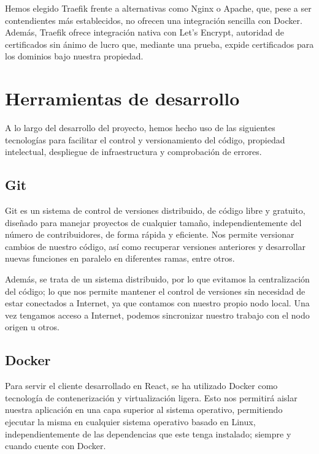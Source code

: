 Hemos elegido Traefik frente a alternativas como Nginx o Apache, que, pese a ser contendientes más establecidos, no ofrecen una integración sencilla con Docker. Además, Traefik ofrece integración nativa con Let's Encrypt, autoridad de certificados sin ánimo de lucro que, mediante una prueba, expide certificados para los dominios bajo nuestra propiedad.


\section{Herramientas de desarrollo}
\label{tec_hab:project}

A lo largo del desarrollo del proyecto, hemos hecho uso de las siguientes tecnologías para facilitar el control y versionamiento del código, propiedad intelectual, despliegue de infraestructura y comprobación de errores.

\subsection{Git}
\label{tec_hab:git}

Git es un sistema de control de versiones distribuido, de código libre y gratuito, diseñado para manejar proyectos de cualquier tamaño, independientemente del número de contribuidores, de forma rápida y eficiente. Nos permite versionar cambios de nuestro código, así como recuperar versiones anteriores y desarrollar nuevas funciones en paralelo en diferentes ramas, entre otros.

Además, se trata de un sistema distribuido, por lo que evitamos la centralización del código; lo que nos permite mantener el control de versiones sin necesidad de estar conectados a Internet, ya que contamos con nuestro propio nodo local. Una vez tengamos acceso a Internet, podemos sincronizar nuestro trabajo con el nodo origen u otros.


\subsection{Docker}
\label{tec_hab:docker}

Para servir el cliente desarrollado en React, se ha utilizado Docker como tecnología de contenerización y virtualización ligera. Esto nos permitirá aislar nuestra aplicación en una capa superior al sistema operativo, permitiendo ejecutar la misma en cualquier sistema operativo basado en Linux, independientemente de las dependencias que este tenga instalado; siempre y cuando cuente con Docker.


